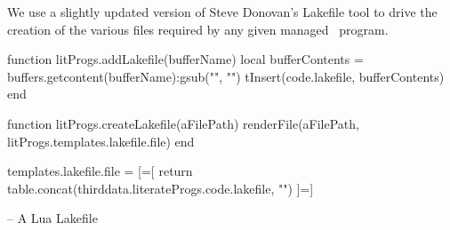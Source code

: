 
\startchapter[title=Lakefile]

We use a slightly updated version of Steve Donovan's Lakefile tool to 
drive the creation of the various files required by any given 
 managed \ConTeXt\ program. 

\startMkIVCode



\setuptyping[Lakefile][option=lua]


\let\oldStopLakefile=\stopLakefile
\def\stopLakefile{%
  \oldStopLakefile%
  \directlua{thirddata.literateProgs.addLakefile('_typing_')}}


\def\createLakefile[#1]{
  \directlua{thirddata.literateProgs.createLakefile('#1')}
}

\stopMkIVCode

\startLuaCode

function litProgs.addLakefile(bufferName)
  local bufferContents = buffers.getcontent(bufferName):gsub("", "\n")
  tInsert(code.lakefile, bufferContents)
end

function litProgs.createLakefile(aFilePath)
  renderFile(aFilePath, litProgs.templates.lakefile.file)
end

\stopLuaCode

\startLuaTemplate

templates.lakefile.file = [=[
{{ return table.concat(thirddata.literateProgs.code.lakefile, "\n\n") }}
]=]

\stopLuaTemplate

\startLakefile
-- A Lua Lakefile

